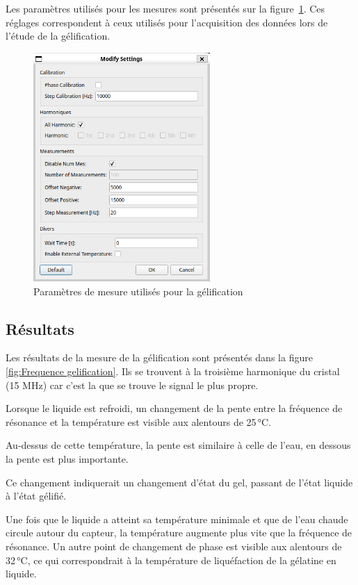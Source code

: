 Les paramètres utilisés pour les mesures sont présentés sur la figure~\ref{fig:SettingsGelification}. Ces réglages correspondent à ceux utilisés pour l'acquisition des données lors de l'étude de la gélification.

\begin{figure}[H]
    \centering
    \includegraphics[width=0.6\textwidth]{assets/figures/SettingsWater-Ethanol.png}
    \caption{Paramètres de mesure utilisés pour la gélification}
    \label{fig:SettingsGelification}
\end{figure}

\subsection{Résultats}

Les résultats de la mesure de la gélification sont présentés dans la figure \ref{fig:Frequence gelification}. Ils se trouvent à la troisième harmonique du cristal (15 MHz) car c'est la que se trouve le signal le plus propre. 

Lorsque le liquide est refroidi, un changement de la pente entre la fréquence de résonance et la température est visible aux alentours de 25 °C. 

Au-dessus de cette température, la pente est similaire à celle de l'eau, en dessous la pente est plus importante.  

Ce changement indiquerait un changement d'état du gel, passant de l'état liquide à l'état gélifié.

Une fois que le liquide a atteint sa température minimale et que de l'eau chaude circule autour du capteur, la température augmente plus vite que la fréquence de résonance. Un autre point de changement de phase est visible aux alentours de 32 °C, ce qui correspondrait à la température de liquéfaction de la gélatine en liquide.

